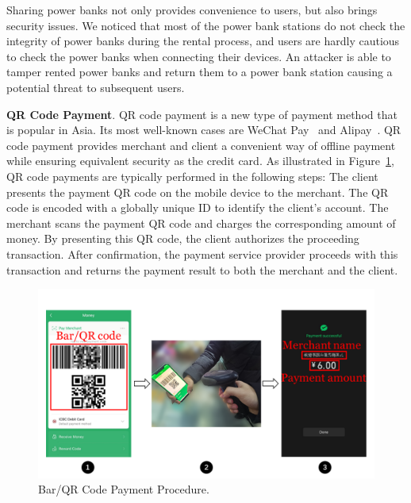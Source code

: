 \documentclass[conference]{IEEEtran}
\newcommand{\hongyi}[1]{}
\newcommand{\shuqing}[1]{}
\begin{document}
Sharing power banks not only provides convenience to users, but also brings security issues.  We noticed that most of the power bank stations do not
check the integrity of power banks during the rental process, and users are
hardly cautious to check the power banks when connecting their devices.  An
attacker is able to tamper rented power banks and return them to a power bank
station causing a potential threat to subsequent users.


\textbf{QR Code Payment}.
QR code payment is a new type of payment method that is popular in Asia. Its most well-known cases are WeChat Pay~\cite{Wechat-pay} and Alipay~\cite{AliPay}. QR code payment provides merchant and client a convenient way of offline payment while ensuring equivalent security as the credit card.
As illustrated in Figure~\ref{fig:qr_payment_procedure},
 QR code payments are typically performed in the following steps:
 The client presents the payment QR code on the mobile device to the merchant.
The QR code is encoded with a globally unique ID to identify the client's account.
 The merchant scans the payment QR code and charges the corresponding amount of money.
By presenting this QR code, the client authorizes the proceeding transaction.
 After confirmation, the payment service provider proceeds with this transaction and returns the payment result to both the merchant and the client.
\shuqing{I think this paragraph can be shorter. No need to explain so many details.}
\hongyi{Dont know how to be more concise.}

\begin{figure}[t]
	\centering
	\includegraphics[width=\linewidth]{./Figs/qr_code_payment.png}
	\caption{Bar/QR Code Payment Procedure.}
	\label{fig:qr_payment_procedure}
\end{figure}
\end{document}
